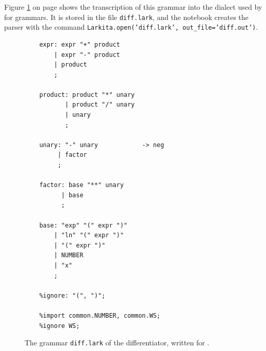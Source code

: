 \noindent
Figure \ref{fig:02-Differentiator.ipynb:grammar} on page \pageref{fig:02-Differentiator.ipynb:grammar}
shows the transcription of this grammar into the dialect used by  for grammars.  It is
stored in the file \texttt{diff.lark}, and the notebook creates the parser with the command
\texttt{Larkita.open('diff.lark', out\_file='diff.out')}.

\begin{figure}[!ht]
\centering
\begin{verbatim}
    expr: expr "+" product
        | expr "-" product
        | product
        ;

    product: product "*" unary
           | product "/" unary
           | unary
           ;

    unary: "-" unary            -> neg
         | factor
         ;

    factor: base "**" unary
          | base
          ;

    base: "exp" "(" expr ")"
        | "ln" "(" expr ")"
        | "(" expr ")"
        | NUMBER
        | "x"
        ;

    %ignore: "(", ")";

    %import common.NUMBER, common.WS;
    %ignore WS;
\end{verbatim}
\vspace*{-0.3cm}
\caption{The grammar \texttt{diff.lark} of the differentiator, written for .}
\label{fig:02-Differentiator.ipynb:grammar}
\end{figure}

